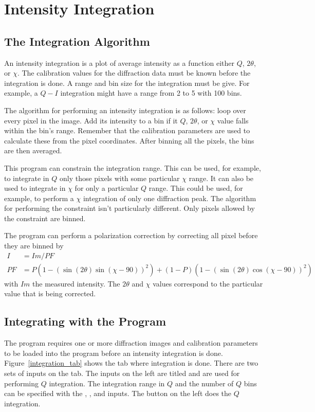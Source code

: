 \chapter{Intensity Integration}

\section{The Integration Algorithm}\label{integration_algorithm}

An intensity integration is a plot of average intensity as 
a function either $Q$, $2\theta$, or $\chi$. The calibration 
values for the diffraction data must be known before 
the integration is done. A range and bin size for the
integration must be give. For example, a $Q-I$ integration 
might have a range from 2 to 5 with 100 bins. 

The algorithm for performing an intensity integration
is as follows: loop over every pixel in the image. 
Add its intensity to a bin if it $Q$, $2\theta$, 
or $\chi$ value falls within the bin's range.
Remember that the calibration parameters are used to 
calculate these from the pixel coordinates.
After binning all the pixels, the bins are then averaged.

This program can constrain the integration range. 
This can be used, for example, to integrate
in $Q$ only those pixels with some particular 
$\chi$ range. It can also be used to integrate
in $\chi$ for only a particular
$Q$ range. This could be used, for example, to
perform a $\chi$ integration of only one
diffraction peak. The algorithm for performing
the constraint isn't particularly different. Only
pixels allowed by the constraint
are binned.

The program can perform a polarization 
correction by correcting all pixel before they
are binned by
\begin{align}
    I&=Im/PF \\ 
    PF&=P(1 - (\sin(2\theta)\sin(\chi-90))^2) + 
    (1 - P)(1 - (\sin(2\theta)\cos(\chi-90))^2)
\end{align}
with $Im$ the measured intensity.  The $2\theta$ 
and $\chi$ values correspond to the particular 
value that is being corrected.

\section{Integrating with the Program}

The program requires one or more diffraction images and
calibration parameters to be loaded into the program
before an intensity integration is done.
Figure~\ref{integration_tab} shows the
 tab where integration is done.
There are two sets of inputs on the tab. 
The inputs on the left are titled 
and are used for performing $Q$ integration.
The integration range in $Q$ and the number of $Q$ bins
can be specified with the , ,
and  inputs. The  button
on the left does the $Q$ integration.


